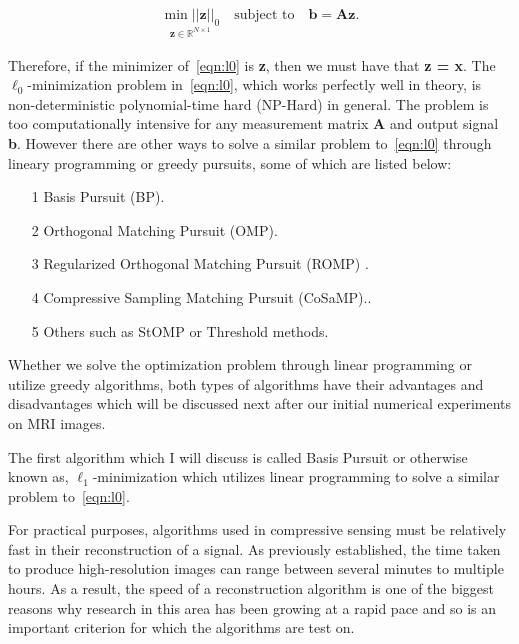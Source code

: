 \documentclass[titlepage,oneside, 12pt]{book}
\theoremstyle{break}
\begin{document}
\begin{equation}
\begin{gathered}
\underset{\textbf{z} \in \mathbb{R}^{N \times 1}}{\min ||\textbf{z}||_{0}} \quad \text{subject to} \quad \textbf{b} = \textbf{Az}. 
\end{gathered}
\label{eqn:l0}
\end{equation}

Therefore, if the minimizer of~\ref{eqn:l0} is \textbf{z}, then we must have that \textbf{z = x}. The $\ell_{0}$-minimization problem in~\ref{eqn:l0}, which works perfectly well in theory, is non-deterministic polynomial-time hard (NP-Hard) in general\cite{DS:A&A}. The problem is too computationally intensive for any measurement matrix \textbf{A} and output signal \textbf{b}. However there are other ways to solve a similar problem to~\ref{eqn:l0} through lineary programming or greedy pursuits\cite{GP}, some of which are listed below:


\begin{itemize}
\item[1] Basis Pursuit (BP)\cite{BP-Atomic}.

\item[2] Orthogonal Matching Pursuit (OMP)\cite{GP-Orthog}.

\item[3] Regularized Orthogonal Matching Pursuit (ROMP) \cite{ROMP1}\cite{ROMP2}.

\item[4] Compressive Sampling Matching Pursuit (CoSaMP).\cite{CoSaMP}.

\item[5] Others such as StOMP\cite{STOMP} or Threshold methods\cite{ItThresh}.
 
\end{itemize}

Whether we solve the optimization problem through linear programming or utilize greedy algorithms, both types of algorithms have their advantages and disadvantages which will be discussed next after our initial numerical experiments on MRI images.  

The first algorithm which I will discuss is called Basis Pursuit or otherwise known as, $\ell_1$-minimization which utilizes linear programming to solve a similar problem to~\ref{eqn:l0}.

For practical purposes, algorithms used in compressive sensing must be relatively fast in their reconstruction of a signal. 
As previously established, the time taken to produce high-resolution images can range between several minutes to multiple hours. As a result, the speed of a reconstruction algorithm is one of the biggest reasons why research in this area has been growing at a rapid pace and so is an important criterion for which the algorithms are test on.
\end{document}
